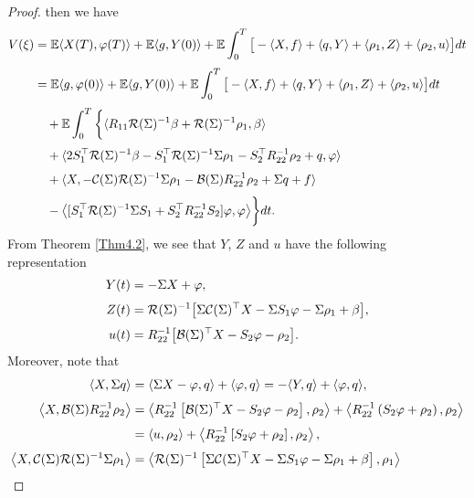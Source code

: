 \documentclass[11pt,times,twoside]{article}
\def\dbE{\mathbb{E}} \def\sE{\mathscr{E}} \def\fE{\mathfrak{E}} \def\cE{{\cal E}} \def\BE{{\bf E}} \def\Be{{\bf e}}
\begin{document}
\begin{proof}
%
then we have
%
\begin{align*}
\ds V(\xi) &=\dbE \lan  X(T), \f(T)\ran  + \dbE \lan  g, Y(0)\ran
+\dbE  \int_{0}^{T}\big[  -\lan  X,  f \ran
 +\lan  q , Y\ran   +\lan  \rho_1 , Z\ran
 + \lan  \rho_2, u \ran  \big] dt\\
%
%
\ns\ds &= \dbE \lan  g, \f(0)\ran +\dbE \lan  g, Y(0)\ran
+\dbE  \int_{0}^{T}\big[  -\lan  X,  f \ran
 +\lan  q , Y\ran   +\lan  \rho_1 , Z\ran
 + \lan  \rho_2, u \ran  \big] dt\\
%
\ns\ds &\q+ \dbE  \int_{0}^{T}\bigg\{\lan  R_{11} \mathcal{R}(\Si)^{-1} \beta
+\mathcal{R}(\Si)^{-1}\rho_1, \beta \ran \\
%
\ns\ds &\q + \lan  2S_{1}^{\top} \mathcal{R}(\Si)^{-1} \beta
-S_{1}^{\top} \mathcal{R}(\Si)^{-1} \Si\rho_1-S_{2}^{\top} R_{22}^{-1}\rho_2+q, \varphi \ran \\
%
\ns\ds &\q + \lan  X, -\cC(\Si) \mathcal{R}(\Si)^{-1}\Si\rho_1
-\cB(\Si)R_{22}^{-1}\rho_2+\Si q+f \ran \\
%
\ns\ds &\q -\big\lan  [S_{1}^{\top} \mathcal{R}(\Si)^{-1}
\Si S_{1}+S_{2}^{\top} R_{22}^{-1} S_{2} ] \varphi, \varphi\big\ran \bigg\} d t.
%
\end{align*}
%
From Theorem \ref{Thm4.2}, we see that $Y$, $Z$ and $u$ have the following representation
%
\begin{align*}
\ds Y(t)&= -\Si X+\f,\\
\ns\ds Z(t)&= \mathcal{R}(\Si)^{-1}\big[\Si \mathcal{C}(\Si)^{\top} X-\Si S_{1} \varphi -\Si\rho_1 +\beta\big], \\
\ns\ds u(t)&= R_{22}^{-1}\big[\mathcal{B}(\Si)^{\top} X-S_{2} \varphi -\rho_2 \big].
\end{align*}
%
Moreover, note that
%
\begin{align*}
\ds \lan  X,\Si q\ran
&=\lan \Si X-\f, q\ran+\lan\f,q\ran=-\lan Y,q\ran +\lan\f,q\ran,\\
%
\ns\ds \left\lan X, \cB(\Si)R_{22}^{-1}\rho_2 \right\ran
&=\left\lan R_{22}^{-1}\left[\mathcal{B}(\Si)^{\top} X-S_{2} \varphi-\rho_2 \right],\rho_2 \right\ran
 +\left\lan R_{22}^{-1}\left(S_{2} \varphi+\rho_2 \right),\rho_2 \right\ran\\
\ns\ds &=\left\lan u,\rho_2\right\ran
 +\left\lan R_{22}^{-1}\left[S_{2} \varphi+\rho_2 \right],\rho_2 \right\ran,\\
%
\ns\ds \left\lan X, \cC(\Si) \mathcal{R}(\Si)^{-1}\Si\rho_1 \right\ran
&=\left\lan \mathcal{R}(\Si)^{-1}\left[\Si \mathcal{C}(\Si)^{\top} X
-\Si S_{1}\varphi -\Si\rho_1 +\beta\right],\rho_1 \right\ran \\

\end{align*}
\end{proof}
\end{document}
